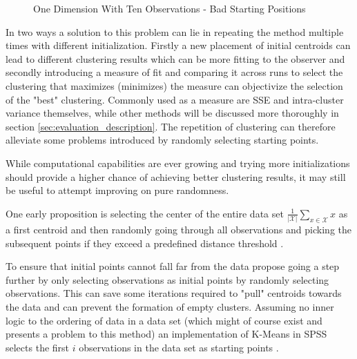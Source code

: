 \begin{figure}[h]
{
}
\caption{One Dimension With Ten Observations - Bad Starting Positions}
\label{img:k_means_bad_init}
\end{figure}
In two ways a solution to this problem can lie in repeating the method multiple times with different initialization. Firstly a new placement of initial centroids can lead to different clustering results which can be more fitting to the observer and secondly introducing a measure of fit and comparing it across runs to select the clustering that maximizes (minimizes) the measure can objectivize the selection of the "best" clustering. Commonly used as a measure are SSE and intra-cluster variance themselves, while other methods will be discussed more thoroughly in section \ref{sec:evaluation_description}. The repetition of clustering can therefore alleviate some problems introduced by randomly selecting starting points.

While computational capabilities are ever growing and trying more initializations should provide a higher chance of achieving better clustering results, it may still be useful to attempt improving on pure randomness.

One early proposition is selecting the center of the entire data set $\frac{1}{\left | \mathcal{X} \right |} \sum_{x \in \mathcal{X}}^{} x $ as a first centroid and then randomly going through all observations and picking the subsequent points if they exceed a predefined distance threshold \cite{ball1967clustering}.

To ensure that initial points cannot fall far from the data \cite{forgy1965cluster,jancey1966multidimensional} propose going a step further by only selecting observations as initial points by randomly selecting observations. This can save some iterations required to "pull" centroids towards the data and can prevent the formation of empty clusters. Assuming no inner logic to the ordering of data in a data set (which might of course exist and presents a problem to this method) an implementation of K-Means in SPSS \cite{noruvsis2011ibm} selects the first $i$ observations in the data set as starting points \cite{macqueen1967some}. 

